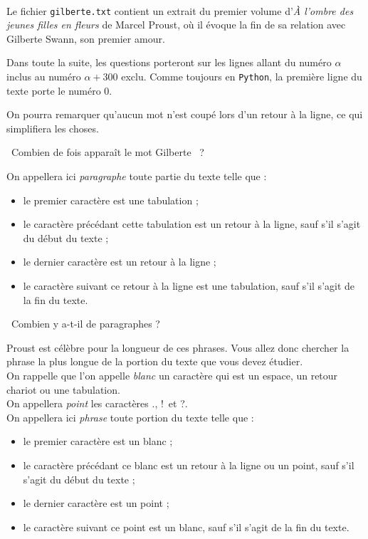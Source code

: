 \exer{[FIC-003]}
\setcounter{numques}{0}~\\


Le fichier \texttt{gilberte.txt} contient un extrait du premier volume d'\emph{À l'ombre des jeunes filles 
en fleurs} de Marcel Proust, où il évoque la fin de sa relation avec Gilberte Swann, son 
premier amour.

Dans toute la suite, les questions porteront sur les lignes allant du numéro $\alpha$ inclus au 
numéro $\alpha+300$ exclu. Comme toujours en \texttt{Python}, la première ligne du texte porte le numéro 
0.

On pourra remarquer qu'aucun mot n'est coupé lors d'un retour à la ligne, ce qui simplifiera les 
choses.

\question\ Combien de fois apparaît le mot \og Gilberte \fg\ ?

\vspace{1cm}

\noindent On appellera ici \emph{paragraphe} toute partie du texte telle que :
\begin{itemize}
 \item le premier caractère est une tabulation ;
\item le caractère précédant cette tabulation est un retour à la  ligne, sauf s'il s'agit du début 
du texte ; 
\item le dernier caractère est un retour à la ligne ;
\item le caractère suivant ce retour à la ligne est une tabulation, sauf s'il s'agit de la fin du 
texte.
\end{itemize}

\question\ Combien y a-t-il de paragraphes ?



\noindent Proust est célèbre pour la longueur de ces phrases. Vous allez donc chercher la phrase la plus 
longue de la portion du texte que vous devez étudier.\\
On rappelle que l'on appelle \emph{blanc} un caractère qui est un espace, un retour chariot ou une 
tabulation.\\
On appellera \emph{point} les caractères \og.\fg, \og!\fg\ et \og?\fg. \\
On appellera ici \emph{phrase} toute portion du texte telle que :
\begin{itemize}
 \item le premier caractère est un blanc ;
 \item le caractère précédant ce blanc est un retour à la ligne ou un point, sauf s'il s'agit du 
début du texte ;
 \item le dernier caractère est un point ;
 \item le caractère suivant ce point est un blanc, sauf s'il s'agit de la fin du texte.
\end{itemize}

